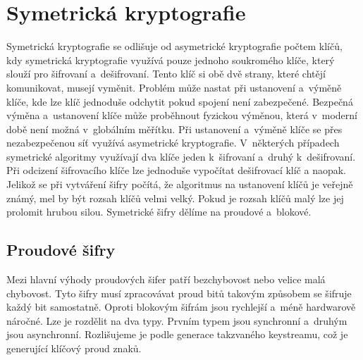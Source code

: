 \section{Symetrická kryptografie}
Symetrická kryptografie se odlišuje od asymetrické kryptografie počtem klíčů, kdy symetrická kryptografie využívá pouze jednoho soukromého klíče, který slouží pro šifrovaní a~dešifrovaní. Tento klíč si obě dvě strany, které chtějí komunikovat, musejí vyměnit. Problém může nastat při ustanovení a~výměně klíče, kde lze klíč jednoduše odchytit pokud spojení není zabezpečené. Bezpečná výměna a~ustanovení klíče může proběhnout fyzickou výměnou, která v~moderní době není možná v~globálním měřítku. Při ustanovení a~výměně klíče se přes nezabezpečenou síť využívá asymetrické kryptografie. V~některých případech symetrické algoritmy využívají dva klíče jeden k~šifrovaní a~druhý k~dešifrovaní. Při odcizení šifrovacího klíče lze jednoduše vypočítat dešifrovací klíč a naopak. Jelikož se při vytváření šifry počítá, že algoritmus na ustanovení klíčů je veřejně známý, mel by být rozsah klíčů velmi velký. Pokud je rozsah klíčů malý lze jej prolomit hrubou silou. Symetrické šifry dělíme na proudové a~blokové.\cite{Nigel9780077099879ISBN}
\subsection{Proudové šifry\label{subsec:streamFunction}}%
Mezi hlavní výhody proudových šifer patří bezchybovost nebo velice malá chybovost. Tyto šifry musí zpracovávat proud bitů takovým způsobem se šifruje každý bit samostatně. Oproti blokovým šifrám jsou rychlejší a~méně hardwarově náročné. Lze je rozdělit na dva typy. Prvním typem jsou synchronní a~druhým jsou asynchronní. Rozlišujeme je podle generace takzvaného keystreamu, což je generující klíčový proud znaků.\cite{HavlicekBakalarka}


